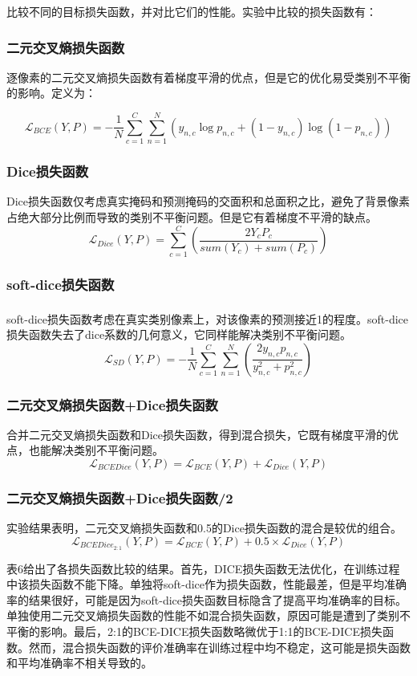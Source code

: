 \documentclass[letterpaper, 10pt, conference, twoside]{ieeeconf}
\newcommand{\upcite}[1]{\textsuperscript{\textsuperscript{\cite{#1}}}}
\begin{document}
比较不同的目标损失函数，并对比它们的性能。实验中比较的损失函数有：

\subsubsection{二元交叉熵损失函数}

逐像素的二元交叉熵损失函数有着梯度平滑的优点，但是它的优化易受类别不平衡的影响。定义为：

\[\mathcal{L}_{BCE}(Y,P)=-\frac{1}{N}\sum_{c=1}^{C}\sum_{n=1}^{N}(y_{n,c}\log p_{n,c}+(1-y_{n,c})\log (1-p_{n,c}))\]


\subsubsection{Dice损失函数}

Dice损失函数仅考虑真实掩码和预测掩码的交面积和总面积之比，避免了背景像素占绝大部分比例而导致的类别不平衡问题。但是它有着梯度不平滑的缺点。
\[\mathcal{L}_{Dice}(Y,P)=\sum_{c=1}^{C}(\frac{2Y_{c}P_{c}}{sum(Y_{c})+sum(P_{c})})\]


\subsubsection{soft-dice损失函数}

soft-dice损失函数\upcite{c6}考虑在真实类别像素上，对该像素的预测接近1的程度。soft-dice损失函数失去了dice系数的几何意义，它同样能解决类别不平衡问题。
\[\mathcal{L}_{SD}(Y,P)=-\frac{1}{N}\sum_{c=1}^{C}\sum_{n=1}^{N}(\frac{2y_{n,c}p_{n,c}}{y_{n,c}^2+p_{n,c}^2})\]

\subsubsection{二元交叉熵损失函数+Dice损失函数}

合并二元交叉熵损失函数和Dice损失函数，得到混合损失，它既有梯度平滑的优点，也能解决类别不平衡问题。
\[\mathcal{L}_{BCEDice}(Y,P)=\mathcal{L}_{BCE}(Y,P)+\mathcal{L}_{Dice}(Y,P)\]

\subsubsection{二元交叉熵损失函数+Dice损失函数/2}
实验结果表明，二元交叉熵损失函数和0.5的Dice损失函数的混合是较优的组合。
\[\mathcal{L}_{BCEDice_{2:1}}(Y,P)=\mathcal{L}_{BCE}(Y,P)+0.5\times\mathcal{L}_{Dice}(Y,P)\]

表6给出了各损失函数比较的结果。首先，DICE损失函数无法优化，在训练过程中该损失函数不能下降。单独将soft-dice作为损失函数，性能最差，但是平均准确率的结果很好，可能是因为soft-dice损失函数目标隐含了提高平均准确率的目标。单独使用二元交叉熵损失函数的性能不如混合损失函数，原因可能是遭到了类别不平衡的影响。最后，2:1的BCE-DICE损失函数略微优于1:1的BCE-DICE损失函数。然而，混合损失函数的评价准确率在训练过程中均不稳定，这可能是损失函数和平均准确率不相关导致的。
\end{document}
